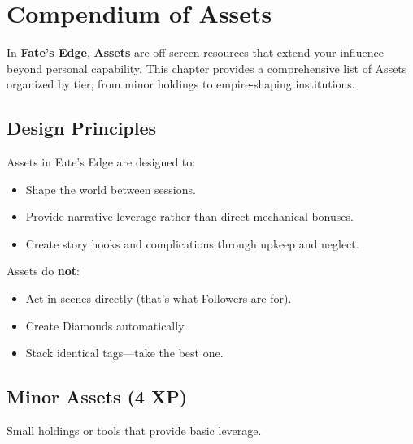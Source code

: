 
\chapter{Compendium of Assets}
\label{ch:compendium-assets}

In \textbf{Fate's Edge}, \textbf{Assets}  are off-screen resources that extend your influence beyond personal capability. This chapter provides a comprehensive list of Assets organized by tier, from minor holdings to empire-shaping institutions.

\section{Design Principles}

Assets in Fate's Edge are designed to:

\begin{itemize}
  \item Shape the world between sessions.
  \item Provide narrative leverage rather than direct mechanical bonuses.
  \item Create story hooks and complications through upkeep and neglect.
\end{itemize}

Assets do \textbf{not}:
\begin{itemize}
  \item Act in scenes directly (that's what Followers are for).
  \item Create Diamonds automatically.
  \item Stack identical tags—take the best one.
\end{itemize}

\section{Minor Assets (4 XP)}

Small holdings or tools that provide basic leverage.

